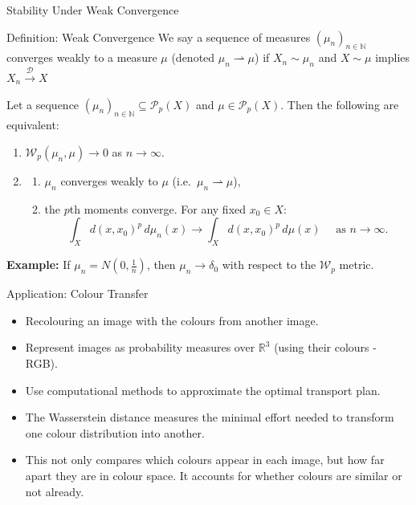 \documentclass{beamer}
\begin{document}
\begin{frame}{Stability Under Weak Convergence}
  \begin{block}{Definition: Weak Convergence}
  We say a sequence of measures $(\mu_n)_{n \in \mathbb{N}}$ converges weakly to a measure $\mu$ (denoted $\mu_n \rightharpoonup \mu$) if $X_n \sim \mu_n$ and $X \sim \mu$ implies $X_n \xrightarrow{\mathcal{D}} X$
  \end{block}
  \begin{theorem}
  Let a sequence $(\mu_n)_{n \in \mathbb{N}}\subseteq\mathcal{P}_p(X)$ and $\mu\in\mathcal{P}_p(X)$. Then the following are equivalent:
\begin{enumerate}
  \item $\mathcal{W}_p(\mu_n,\mu)\to0$ as $n\to\infty$.
  \item 
    \begin{enumerate}
      \item $\mu_n$ converges weakly to $\mu$ (i.e.\ $\mu_n \rightharpoonup \mu$),
      \item the $p$th moments converge. For any fixed $x_0 \in X$:
      \[
        \int_{X} d(x,x_0)^p\,d\mu_n(x)
        \to 
        \int_{X} d(x,x_0)^p\,d\mu(x)
        \quad\text{ as } n \to \infty.
      \]
    \end{enumerate}
\end{enumerate}
\end{theorem}
\textbf{Example:} If $\mu_n = N(0, \frac{1}{n})$, then $\mu _n \to \delta_0$ with respect to the $\mathcal{W}_p$ metric.
\end{frame}


\begin{frame}{Application: Colour Transfer}
  \begin{itemize}
    \item Recolouring an image with the colours from another image.
    \item Represent images as probability measures over $\mathbb{R}^3$ (using their colours - RGB).
    \item Use computational methods to approximate the optimal transport plan.
    \item The Wasserstein distance measures the minimal effort needed to transform one colour distribution into another.
    \item This not only compares which colours appear in each image, but how far apart they are in colour space. It accounts for whether colours are similar or not already.
  \end{itemize}

\end{frame}
\end{document}
